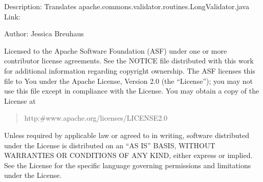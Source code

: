 \documentclass[letterpaper,10pt,english]{sphinxmanual}
\begin{document}
\sphinxAtStartPar
Description: Translates apache.commons.validator.routines.LongValidator.java
Link: 

\sphinxAtStartPar
Author: Jessica Breuhaus
\begin{description}
\sphinxAtStartPar
Licensed to the Apache Software Foundation (ASF) under one or more
contributor license agreements.  See the NOTICE file distributed with
this work for additional information regarding copyright ownership.
The ASF licenses this file to You under the Apache License, Version 2.0
(the “License”); you may not use this file except in compliance with
the License.  You may obtain a copy of the License at
\begin{quote}

\sphinxAtStartPar
http:\#www.apache.org/licenses/LICENSE\sphinxhyphen{}2.0
\end{quote}

\sphinxAtStartPar
Unless required by applicable law or agreed to in writing, software
distributed under the License is distributed on an “AS IS” BASIS,
WITHOUT WARRANTIES OR CONDITIONS OF ANY KIND, either express or implied.
See the License for the specific language governing permissions and
limitations under the License.

\end{description}
\end{document}
